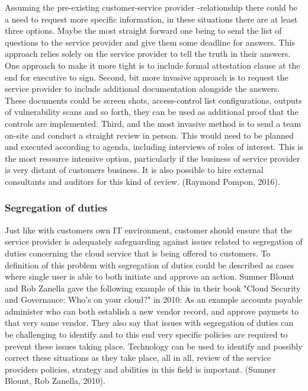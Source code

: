 \documentclass{article}
\begin{document}
Assuming the pre-existing customer-service provider -relationship there could be a need to request more specific information, in these situations there are at least three options. Maybe the most straight forward one being to send the list of questions to the service provider and give them some deadline for answers. This approach relies solely on the service provider to tell the truth in their answers. One approach to make it more tight is to include formal attestation clause at the end for executive to sign. Second, bit more invasive approach is to request the service provider to include additional documentation alongside the answers. These documents could be screen shots, access-control list configurations, outputs of vulnerability scans and so forth, they can be used as additional proof that the controls are implemented. Third, and the most invasive method is to send a team on-site and conduct a straight review in person. This would need to be planned and executed according to agenda, including interviews of roles of interest. This is the most resource intensive option, particularly if the business of service provider is very distant of customers business. It is also possible to hire external consultants and auditors for this kind of review. (Raymond Pompon, 2016). 
\subsubsection{Segregation of duties}
Just like with customers own IT environment, customer should ensure that the service provider is adequately safeguarding against issues related to segregation of duties concerning the cloud service that is being offered to customers.
To definition of this problem with segregation of duties could be described as cases where single user is able to both initiate and approve an action. Sumner Blount and Rob Zanella gave the following example of this in their book "Cloud Security and Governance: Who's on your cloud?" in 2010: As an example accounts payable administer who can both establish a new vendor record, and approve paymets to that very same vendor. They also say that issues with segregation of duties can be challenging to identify and to this end very specific policies are required to prevent these issues taking place. Technology can be used to identify and possibly correct these situations as they take place, all in all, review of the service providers policies, strategy and abilities in this field is important. (Sumner Blount, Rob Zanella, 2010). 
\end{document}
